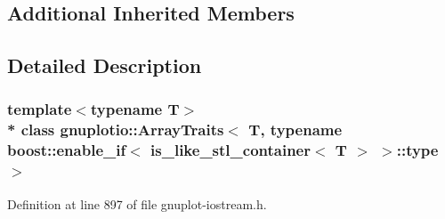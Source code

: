 \subsection*{Additional Inherited Members}


\subsection{Detailed Description}
\subsubsection*{template$<$typename T$>$\\*
class gnuplotio\+::\+Array\+Traits$<$ T, typename boost\+::enable\+\_\+if$<$ is\+\_\+like\+\_\+stl\+\_\+container$<$ T $>$ $>$\+::type $>$}



Definition at line 897 of file gnuplot-\/iostream.\+h.

